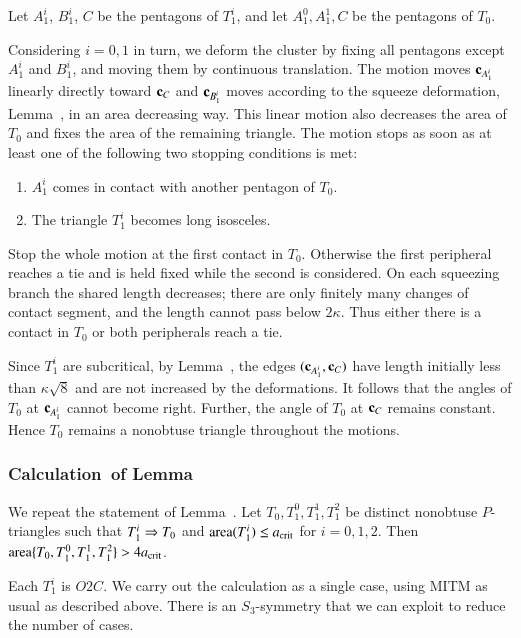 Let $A_1^i$, $B_1^i$, $C$ be the pentagons of $T_1^i$,
and let $A_1^0,A_1^1,C$ be the pentagons of $T_0$.

Considering $i=0,1$ in turn, we deform the cluster by fixing all pentagons
except $A_1^i$ and $B_1^i$, and moving them by continuous translation.
The motion moves ${\mathbf c}_{A_1^i}$ linearly directly toward ${\mathbf c}_C$ and ${\mathbf c}_{B_1^i}$
moves according to the squeeze deformation, Lemma~,
in an area decreasing way.  This linear motion also decreases the area
of $T_0$ and fixes the area of the remaining triangle.
The motion stops as soon as at least one of the
following two stopping conditions is met:
\begin{enumerate}
\item $A_1^i$ comes in contact with another pentagon of $T_0$.
\item The triangle $T_1^i$ becomes long isosceles.
\end{enumerate}
Stop the whole motion at the first contact in $T_0$. Otherwise the
first peripheral reaches a tie and is held fixed while the second
is considered. On each squeezing branch the shared length decreases;
there are only finitely many changes of contact segment, and the
length cannot pass below $2\kappa$. Thus either there is a contact
in $T_0$ or both peripherals reach a tie.

Since $T_1^i$ are subcritical, by Lemma~, the edges
$({\mathbf c}_{A_1^i},{\mathbf c}_C)$ have length initially less than $\kappa\sqrt8$ and
are not increased by the deformations.  It follows that the angles of $T_0$
at ${\mathbf c}_{A_1^i}$ cannot become right.  Further, the angle of $T_0$ at ${\mathbf c}_C$
remains constant.  Hence $T_0$ remains a nonobtuse triangle throughout
the motions.

\subsubsection{Calculation~of Lemma~} 

We repeat the statement of Lemma~. Let
$T_0,T_1^0,T_1^1,T_1^2$ be distinct nonobtuse $P$-triangles such that
$T_1^i\Rightarrow T_0$ and ${\operatorname{area}}(T_1^i)\le a_\text{crit}$ for $i=0,1,2$. Then ${\operatorname{area}}\{T_0,T_1^0,T_1^1,T_1^2\} >
4a_\text{crit}$. %

Each $T_1^i$ is $O2C$.  We carry out the calculation as a single case,
using MITM as usual as described above.  There is an $S_3$-symmetry %
that we can exploit to reduce the number of cases. 

